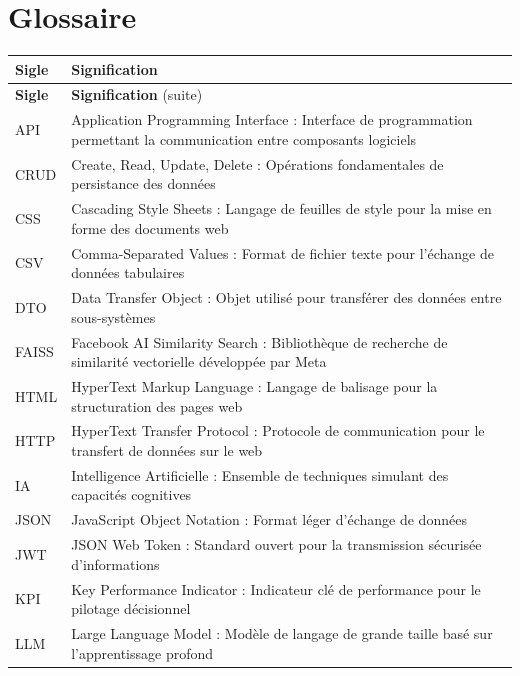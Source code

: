 ﻿%
\chapter*{Glossaire}

\begin{longtable}{@{} l p{} @{}}
    \textbf{Sigle} & \textbf{Signification} \\
    \midrule
\endfirsthead
    \textbf{Sigle} & \textbf{Signification} (suite) \\
    \midrule
\endhead

    API & Application Programming Interface : Interface de programmation permettant la communication entre composants logiciels \\[0.3cm]
    CRUD & Create, Read, Update, Delete : Opérations fondamentales de persistance des données \\[0.3cm]
    CSS & Cascading Style Sheets : Langage de feuilles de style pour la mise en forme des documents web \\[0.3cm]
    CSV & Comma-Separated Values : Format de fichier texte pour l'échange de données tabulaires \\[0.3cm]
    DTO & Data Transfer Object : Objet utilisé pour transférer des données entre sous-systèmes \\[0.3cm]
    FAISS & Facebook AI Similarity Search : Bibliothèque de recherche de similarité vectorielle développée par Meta \\[0.3cm]
    HTML & HyperText Markup Language : Langage de balisage pour la structuration des pages web \\[0.3cm]
    HTTP & HyperText Transfer Protocol : Protocole de communication pour le transfert de données sur le web \\[0.3cm]
    IA & Intelligence Artificielle : Ensemble de techniques simulant des capacités cognitives \\[0.3cm]
    JSON & JavaScript Object Notation : Format léger d'échange de données \\[0.3cm]
    JWT & JSON Web Token : Standard ouvert pour la transmission sécurisée d'informations \\[0.3cm]
    KPI & Key Performance Indicator : Indicateur clé de performance pour le pilotage décisionnel \\[0.3cm]
    LLM & Large Language Model : Modèle de langage de grande taille basé sur l'apprentissage profond \\[0.3cm]

\end{longtable}
